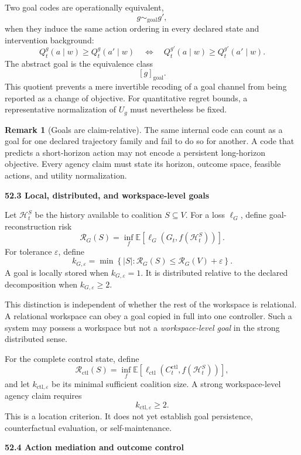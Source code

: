\documentclass[11pt,letterpaper]{article}
\newcommand{\Risk}{\mathcal R}
\newcommand{\subtopic}[1]{%
 \vspace{0.45em}
 {\bfseries\color{AccentColor} #1\par}
}
\theoremstyle{plain}
\theoremstyle{definition}
\newtheorem{remark}[theorem]{Remark}
\begin{document}
Two goal codes are operationally equivalent,
\[
g\sim_{\mathrm{goal}}g',
\]
when they induce the same action ordering in every declared state and
intervention background:
\[
Q_t^g(a\mid w)
\geq
Q_t^g(a'\mid w)
\quad\Longleftrightarrow\quad
Q_t^{g'}(a\mid w)
\geq
Q_t^{g'}(a'\mid w).
\]
The abstract goal is the equivalence class
\[
[g]_{\mathrm{goal}}.
\]
This quotient prevents a mere invertible recoding of a goal channel from being
reported as a change of objective. For quantitative regret bounds, a
representative normalization of \(U_g\) must nevertheless be fixed.

\begin{remark}[Goals are claim-relative]
The same internal code can count as a goal for one declared trajectory family
and fail to do so for another. A code that predicts a short-horizon action may
not encode a persistent long-horizon objective. Every agency claim must state
its horizon, outcome space, feasible actions, and utility normalization.
\end{remark}

\subtopic{52.3 Local, distributed, and workspace-level goals}

Let \(\mathcal H_t^S\) be the history available to coalition \(S\subseteq V\).
For a loss \(\ell_G\), define goal-reconstruction risk
\[
\Risk_G(S)
=
\inf_f
\mathbb E
\left[
\ell_G
\left(
G_t,
f(\mathcal H_t^S)
\right)
\right].
\]
For tolerance \(\varepsilon\), define
\[
k_{G,\varepsilon}
=
\min
\left\{
|S|:
\Risk_G(S)
\leq
\Risk_G(V)+\varepsilon
\right\}.
\]
A goal is locally stored when \(k_{G,\varepsilon}=1\). It is distributed
relative to the declared decomposition when \(k_{G,\varepsilon}\geq2\).

This distinction is independent of whether the rest of the workspace is
relational. A relational workspace can obey a goal copied in full into one
controller. Such a system may possess a workspace but not a
\emph{workspace-level goal} in the strong distributed sense.

For the complete control state, define
\[
\Risk_{\mathrm{ctl}}(S)
=
\inf_f
\mathbb E
\left[
\ell_{\mathrm{ctl}}
\left(
C_t^{\mathrm{ctl}},
f(\mathcal H_t^S)
\right)
\right],
\]
and let \(k_{\mathrm{ctl},\varepsilon}\) be its minimal sufficient coalition
size. A strong workspace-level agency claim requires
\[
\boxed{k_{\mathrm{ctl},\varepsilon}\geq2.}
\]
This is a location criterion. It does not yet establish goal persistence,
counterfactual evaluation, or self-maintenance.

\subtopic{52.4 Action mediation and outcome control}
\end{document}
